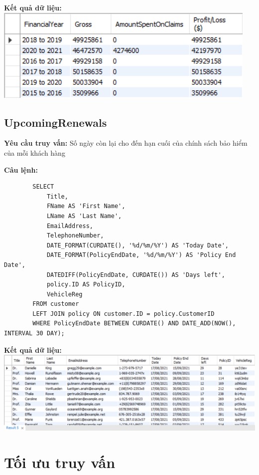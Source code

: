 \documentclass[12pt,a4paper]{report}
\begin{document}
	{\bf Kết quả dữ liệu:}
	\\
	\includegraphics[width=\linewidth]{ProfitsByFiscalYear}
	
\subsection{UpcomingRenewals}
	{\bf Yêu cầu truy vấn:} Số ngày còn lại cho đến hạn cuối của chính sách bảo hiểm của mỗi khách hàng
	
	
	{\bf Câu lệnh:}
	\begin{lstlisting}
		SELECT
			Title,
    		FName AS 'First Name',
   			LName AS 'Last Name',
    		EmailAddress,
    		TelephoneNumber,
    		DATE_FORMAT(CURDATE(), '%d/%m/%Y') AS 'Today Date',
    		DATE_FORMAT(PolicyEndDate, '%d/%m/%Y') AS 'Policy End Date',
    		DATEDIFF(PolicyEndDate, CURDATE()) AS 'Days left',
			policy.ID AS PolicyID,
    		VehicleReg
		FROM customer
		LEFT JOIN policy ON customer.ID = policy.CustomerID
		WHERE PolicyEndDate BETWEEN CURDATE() AND DATE_ADD(NOW(), INTERVAL 30 DAY);
	\end{lstlisting}

	{\bf Kết quả dữ liệu:}
	\\
	\includegraphics[width=\linewidth]{UpcomingRenewals}
	
\section{Tối ưu truy vấn}
\end{document}
